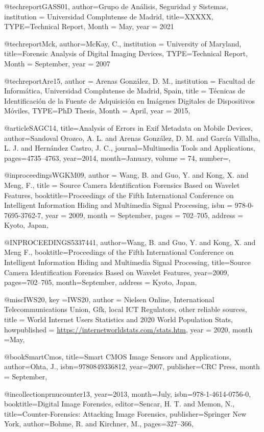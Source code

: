 @techreport{GASS01,
	author={{Grupo de Análisis, Seguridad y Sistemas}},
	institution = {Universidad Complutense de Madrid},
	title={{{XXXXX}}},
	TYPE={{Technical Report}},
	Month = {May},
	year = {2021}
}




@techreport{Mck,
	author={McKay, C.},
	institution = {University of Maryland},
	title={{{Forensic Analysis of Digital Imaging Devices}}},
	TYPE={{Technical Report}},
	Month = {September},
	year = {2007}
}

@techreport{Are15,
author = {Arenas Gonz\'alez, D. M.},
institution = {Facultad de Inform\'{a}tica, Universidad Complutense de Madrid, Spain},
title  = {{{T\'ecnicas de Identificaci\'on de la Fuente de Adquisici\'on en Im\'agenes Digitales de Dispositivos M\'oviles}}},
TYPE={{PhD Thesis}},
Month = {April},
year = {2015},
}


@article{SAGC14,
	title={{{Analysis of Errors in Exif Metadata on Mobile Devices}}},
	author={Sandoval Orozco, A. L. and Arenas Gonz\'alez, D. M. and Garc\'ia Villalba, L. J. and Hern\'andez Castro, J. C.},
	journal={Multimedia Tools and Applications},
	pages={4735--4763},
	year={2014},
	month={January},
	volume = {74},
	number={},
}


@inproceedings{WGKM09,
author = {Wang, B. and Guo, Y. and Kong, X. and Meng, F.},
title = {{{Source Camera Identification Forensics Based on Wavelet Features}}},
booktitle={Proceedings of the Fifth International Conference on Intelligent Information Hiding and Multimedia Signal Processing},
isbn = {978-0-7695-3762-7},
year = {2009},
month = {September},
pages = {702--705},
address = {Kyoto, Japan},
}


@INPROCEEDINGS{5337441, 
author={Wang, B.  and Guo, Y.  and Kong, X.  and Meng F.}, 
booktitle={Proceedings of the Fifth International Conference on Intelligent Information Hiding and Multimedia Signal Processing}, 
title={{Source Camera Identification Forensics Based on Wavelet Features}}, 
year={2009}, 
pages={702--705}, 
month={September},
address = {Kyoto, Japan},
}


@misc{IWS20,
key ={IWS20},
author = {Nielsen Online, International Telecommunications Union, Gfk, local ICT Regulators, other reliable sources},
title = {{{World Internet Users Statistics and 2020 World Population Stats}}},
howpublished = {\url{https://internetworldstats.com/stats.htm}},
year = {2020},
month ={May},
}


@book{SmartCmos,
  title={{{Smart CMOS Image Sensors and Applications}}},
  author={Ohta, J.},
  isbn={9780849336812},
  year={2007},
  publisher={CRC Press},
  month = {September},
}

@incollection{prnucounter13,
year={2013},
month={July},
isbn={978-1-4614-0756-0},
booktitle={Digital Image Forensics},
editor={Sencar, H. T. and Memon, N.},
title={{{Counter-Forensics: Attacking Image Forensics}}},
publisher={Springer New York},
author={Bohme, R. and Kirchner, M.},
pages={327--366},
}